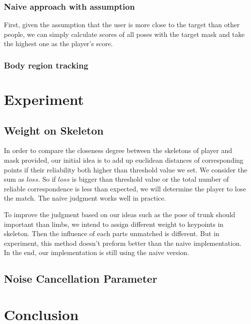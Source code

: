 \documentclass[11pt,twocolumn,letterpaper]{article}
\begin{document}
\subsubsection {Naive approach with assumption}
\par
First, given the assumption that the user is more close to the target than other people, we can simply calculate scores of all poses with the target mask and take the highest one as the player's score.
\subsubsection{Body region tracking}
\section{Experiment}
	\subsection{Weight on Skeleton}
      \par In order to compare the closeness degree between the skeletons of player and mask provided, our initial idea is to add up euclidean distances of corresponding points if their reliability both higher than threshold value we set. We consider the sum as $loss$. So if $loss$ is bigger than threshold value or the total number of reliable correspondence is less than expected, we will determine the player to lose the match. The naive judgment works well in practice.
      \par To improve the judgment based on our ideas such as the pose of trunk should important than limbs, we intend to assign different weight to keypoints in skeleton. Then the influence of each parts unmatched is different. But in experiment, this method doesn't preform better than the naive implementation. In the end, our implementation is still using the naive version.
  \subsection{Noise Cancellation Parameter}
\section{Conclusion}


{\small


}
\end{document}
